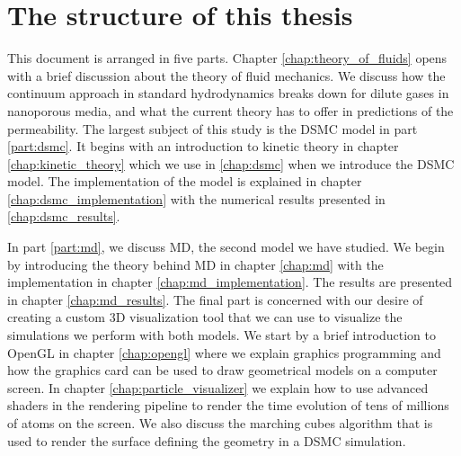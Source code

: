 \section{The structure of this thesis}
\label{sec:structure}
This document is arranged in five parts. Chapter \ref{chap:theory_of_fluids} opens with a brief discussion about the theory of fluid mechanics. We discuss how the continuum approach in standard hydrodynamics breaks down for dilute gases in nanoporous media, and what the current theory has to offer in predictions of the permeability. The largest subject of this study is the DSMC model in part \ref{part:dsmc}. It begins with an introduction to kinetic theory in chapter \ref{chap:kinetic_theory} which we use in \ref{chap:dsmc} when we introduce the DSMC model. The implementation of the model is explained in chapter \ref{chap:dsmc_implementation} with the numerical results presented in \ref{chap:dsmc_results}.

In part \ref{part:md}, we discuss MD, the second model we have studied. We begin by introducing the theory behind MD in chapter \ref{chap:md} with the implementation in chapter \ref{chap:md_implementation}. The results are presented in chapter \ref{chap:md_results}. The final part is concerned with our desire of creating a custom 3D visualization tool that we can use to visualize the simulations we perform with both models. We start by a brief introduction to OpenGL in chapter \ref{chap:opengl} where we explain graphics programming and how the graphics card can be used to draw geometrical models on a computer screen. In chapter \ref{chap:particle_visualizer} we explain how to use advanced shaders in the rendering pipeline to render the time evolution of tens of millions of atoms on the screen. We also discuss the marching cubes algorithm that is used to render the surface defining the geometry in a DSMC simulation.